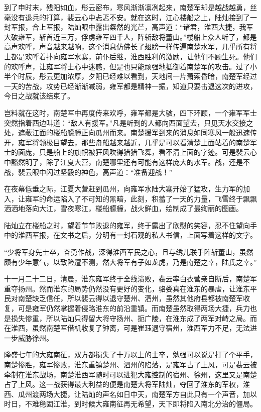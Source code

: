 到了申时末，残阳如血，彤云密布，寒风渐渐凛冽起来，南楚军却是越战越勇，丝毫没有退兵的打算，裴云心中忐忑不安。就在这时，江心楼船之上，陆灿接到了一封军报，合上军报，陆灿眼中露出粲然的光芒，高声道：“诸君，淮西大捷，我军大破雍军，斩首近三万，俘虏雍军四千人，阵斩敌将董山。”楼船上众人听了，都是高声欢呼，声音越来越响，这个消息仿佛长了翅膀一样传遍南楚水军，几乎所有将士都是欢呼着扑向雍军水寨，前仆后继，淮西胜利的激励，让他们不顾生死。他们的欢呼声，让雍军将士心中迷惑，但是也只能顽强地抵御着南楚军的攻击。过了小半个时辰，彤云更加浓厚，夕阳已经难以看到，天地间一片萧索昏暗，南楚军经过一天的苦战，攻势已经渐渐减弱，雍军都是精神一振，知道只要击退这次的进攻，今日之战就该结束了。

岂料就在这时，南楚军中再度传来欢呼，雍军都是大骇，四下环顾，一个雍军军士突然指着西边叫道：“敌人有援军。”凡是听到的人都向西面望去，只见天水交接之处，遮蔽江面的楼船艨艟正向瓜州而来。南楚援军到来的消息如同寒风一般迅速传开，雍军将领极目望去，那些舟船越来越近，几乎是可以看清楚上面站着的南楚军士的面庞，只是船上的旗帜被狂风吹得猎猎飞舞，看不清上面的字迹。可是裴云心中豁然明了，除了江夏大营，南楚哪里还有可能有这样庞大的水军。战，还是不战，裴云眼中闪过坚毅的神色，高声道：“准备迎战！”

在夜幕低垂之际，江夏大营赶到瓜州，向雍军水陆大寨开始了猛攻，生力军的加入，让雍军的命运陷入了不可知的黑暗，此刻，积蓄了一天的力量，飞雪终于飘飘洒洒地落向大江，雪夜寒江，楼船艨艟，战火鲜血，绘制成了最绚丽的图画。

陆灿立在楼船之时，望着节节败退的雍军，终于露出了欣慰的笑容，忍不住望向手中的淮西军报，在文书之后，分明有一封石观的私人书信，上面写着这样的文字。

“少将军身先士卒，奋勇作战，深得淮西军民之心，且与绣儿联手阵斩董山，虽然颇有少年意气，以致险遭不测，然大将军有子如龙虎，乃是南楚之幸，陆氏之幸。”

十一月二十二日，清晨，淮东雍军终于全线溃败，裴云率白衣营亲自断后，南楚军重夺扬州。然而淮东的局势仍然没有更好的变化，骆娄真在淮东的暴虐，让淮东平民对南楚缺乏信任，所以裴云得以退守楚州、泗州，虽然其他府县都被南楚军收复，可是雍军仍然掌握着侵略淮东的前沿重镇。而南楚虽然取得两场大捷，兵力也是损失惨重，所以陆灿只得留大将守扬州、扼广陵，在淮东成了两军对峙之局。而在淮西，虽然南楚军借机收复了钟离，可是崔珏退守宿州，淮西军力不足，无法进一步威胁徐州。

隆盛七年的大雍南征，双方都损失了十万以上的士卒，勉强可以说是打了个平手，南楚惨胜，雍军惨败，淮东重镇楚州、泗州的陷落，是雍军占了上风，可是裴云被牵制在淮东战场，南楚淮西军随时可以进犯大雍控制的宿州、徐州，这里又是南楚占了上风。这一战获得最大利益的便是南楚大将军陆灿，夺回了淮东的军权，淮西、瓜州渡两场大捷，让陆灿的声名如日中天，南楚军方自此只有一个声音，加以时日，不难稳固江淮，到时候大雍南征再无希望，天下即将陷入南北分治的僵局。

